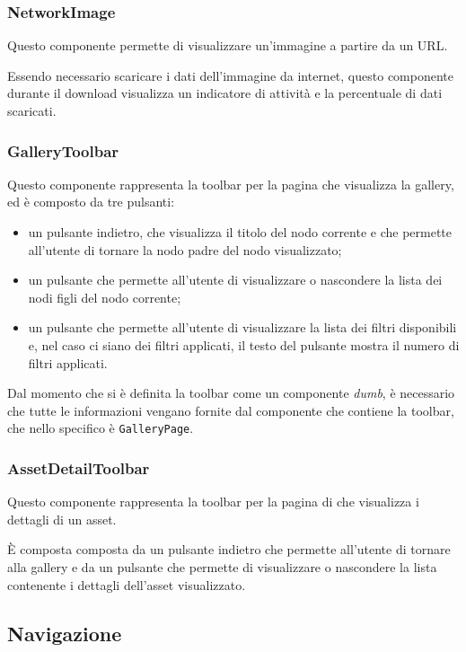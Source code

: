 \subsubsection{NetworkImage}

Questo componente permette di visualizzare un'immagine a partire da un URL.

Essendo necessario scaricare i dati dell'immagine da internet, questo componente durante il download visualizza un indicatore di attività e la percentuale di dati scaricati.

\subsubsection{GalleryToolbar}

Questo componente rappresenta la toolbar per la pagina che visualizza la gallery, ed è composto da tre pulsanti:
\begin{itemize}
\item un pulsante indietro, che visualizza il titolo del nodo corrente e che permette all'utente di tornare la nodo padre del nodo visualizzato;
\item un pulsante che permette all'utente di visualizzare o nascondere la lista dei nodi figli del nodo corrente;
\item un pulsante che permette all'utente di visualizzare la lista dei filtri disponibili e, nel caso ci siano dei filtri applicati, il testo del pulsante mostra il numero di filtri applicati.
\end{itemize}

Dal momento che si è definita la toolbar come un componente \textit{dumb}, è necessario che tutte le informazioni vengano fornite dal componente che contiene la toolbar, che nello specifico è \texttt{GalleryPage}.

\subsubsection{AssetDetailToolbar}

Questo componente rappresenta la toolbar per la pagina di che visualizza i dettagli di un asset.

\`E composta composta da un pulsante indietro che permette all'utente di tornare alla gallery e da un pulsante che permette di visualizzare o nascondere la lista contenente i dettagli dell'asset visualizzato.

\subsection{Navigazione}

